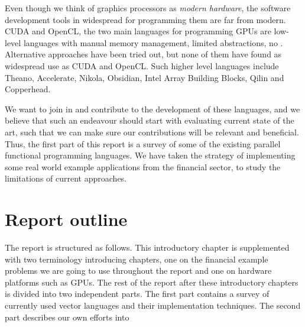Even though we think of graphics processors as \textit{modern
  hardware}, the software development tools in widespread for
programming them are far from modern. CUDA and OpenCL, the two main
languages for programming GPUs are low-level languages with manual
memory management, limited abstractions, no . Alternative approaches have been tried out, but none of them
have found as widespread use as CUDA and OpenCL. Such higher level
languages include Theano, Accelerate, Nikola, Obsidian, Intel Array
Building Blocks, Qilin and Copperhead.


We want to join in and contribute to the development of these
languages, and we believe that such an endeavour should start with
evaluating current state of the art, such that we can make sure our
contributions will be relevant and beneficial. Thus, the first part of
this report is a survey of some of the existing parallel functional
programming languages. We have taken the strategy of implementing some
real world example applications from the financial sector, to study
the limitations of current approaches.



\section{Report outline}
The report is structured as follows. This introductory chapter is
supplemented with two terminology introducing chapters, one on the
financial example problems we are going to use throughout the report
and one on hardware platforms such as GPUs. The rest of the report
after these introductory chapters is divided into two independent
parts. The first part contains a survey of currently used vector
languages and their implementation techniques. The second part
describes our own efforts into \todo{\ldots}

